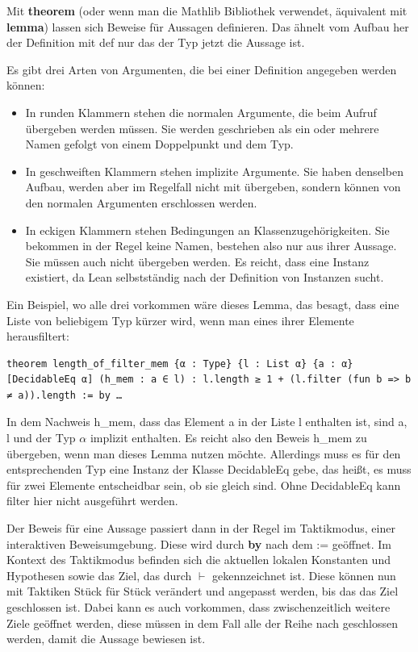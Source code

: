 Mit \textbf{theorem} (oder wenn man die Mathlib Bibliothek verwendet, äquivalent mit \textbf{lemma}) lassen sich Beweise für Aussagen definieren.
Das ähnelt vom Aufbau her der Definition mit def nur das der Typ jetzt die Aussage ist.

Es gibt drei Arten von Argumenten, die bei einer Definition angegeben werden können:
\begin{itemize}
  \item In runden Klammern stehen die normalen Argumente, die beim Aufruf übergeben werden müssen.
        Sie werden geschrieben als ein oder mehrere Namen gefolgt von einem Doppelpunkt und dem Typ.
  \item In geschweiften Klammern stehen implizite Argumente.
        Sie haben denselben Aufbau, werden aber im Regelfall nicht mit übergeben, sondern können von den normalen Argumenten erschlossen werden.
  \item In eckigen Klammern stehen Bedingungen an Klassenzugehörigkeiten.
        Sie bekommen in der Regel keine Namen, bestehen also nur aus ihrer Aussage.
        Sie müssen auch nicht übergeben werden.
        Es reicht, dass eine Instanz existiert, da Lean selbstständig nach der Definition von Instanzen sucht.
\end{itemize}
Ein Beispiel, wo alle drei vorkommen wäre dieses Lemma, das besagt, dass eine Liste von beliebigem Typ kürzer wird, wenn man eines ihrer Elemente herausfiltert:

\begin{lstlisting}
theorem length_of_filter_mem {α : Type} {l : List α} {a : α} [DecidableEq α] (h_mem : a ∈ l) : l.length ≥ 1 + (l.filter (fun b => b ≠ a)).length := by …
\end{lstlisting}

In dem Nachweis h\_mem, dass das Element a in der Liste l enthalten ist, sind a, l und der Typ $\alpha$ implizit enthalten.
Es reicht also den Beweis h\_mem zu übergeben, wenn man dieses Lemma nutzen möchte.
Allerdings muss es für den entsprechenden Typ eine Instanz der Klasse DecidableEq gebe, das heißt, es muss für zwei Elemente entscheidbar sein, ob sie gleich sind.
Ohne DecidableEq kann filter hier nicht ausgeführt werden.

Der Beweis für eine Aussage passiert dann in der Regel im Taktikmodus, einer interaktiven Beweisumgebung.
Diese wird durch \textbf{by} nach dem := geöffnet.
Im Kontext des Taktikmodus befinden sich die aktuellen lokalen Konstanten und Hypothesen sowie das Ziel, das durch $\vdash$ gekennzeichnet ist.
Diese können nun mit Taktiken Stück für Stück verändert und angepasst werden, bis das das Ziel geschlossen ist.
Dabei kann es auch vorkommen, dass zwischenzeitlich weitere Ziele geöffnet werden, diese müssen in dem Fall alle der Reihe nach geschlossen werden, damit die Aussage bewiesen ist.

